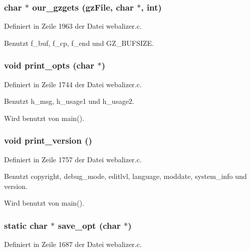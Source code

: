 \subsubsection{\setlength{\rightskip}{0pt plus 5cm}char $\ast$ our\_\-gzgets (gz\-File, char $\ast$, int)}\label{webalizer_8c_8abb48bca3dbb868295ee2ce344e3d95}




Definiert in Zeile 1963 der Datei webalizer.c.

Benutzt f\_\-buf, f\_\-cp, f\_\-end und GZ\_\-BUFSIZE.
\subsubsection{\setlength{\rightskip}{0pt plus 5cm}void print\_\-opts (char $\ast$)}\label{webalizer_8c_beb1db8f30c512b9050440ec49248364}




Definiert in Zeile 1744 der Datei webalizer.c.

Benutzt h\_\-msg, h\_\-usage1 und h\_\-usage2.

Wird benutzt von main().
\subsubsection{\setlength{\rightskip}{0pt plus 5cm}void print\_\-version ()}\label{webalizer_8c_6302aaae12249e8ea16bfdc7de892f21}




Definiert in Zeile 1757 der Datei webalizer.c.

Benutzt copyright, debug\_\-mode, editlvl, language, moddate, system\_\-info und version.

Wird benutzt von main().
\subsubsection{\setlength{\rightskip}{0pt plus 5cm}static char $\ast$ save\_\-opt (char $\ast$)\hspace{0.3cm}{\tt  [static]}}\label{webalizer_8c_90af490e0665082d8b56fea2667356f4}




Definiert in Zeile 1687 der Datei webalizer.c.
